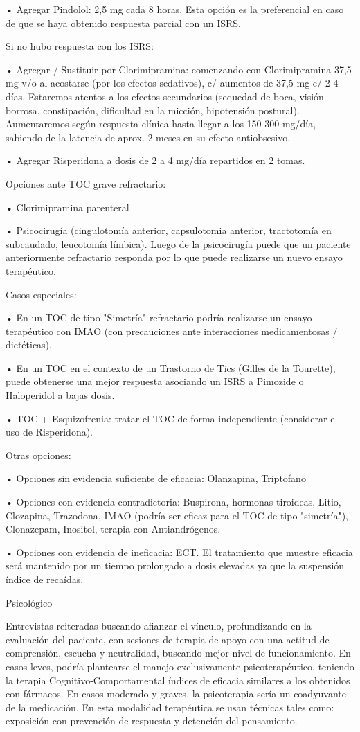 \documentclass[encares.tex]{subfiles}
\begin{document}
• Agregar Pindolol: 2,5 mg cada 8 horas. Esta opción es la preferencial en caso de que se haya obtenido respuesta parcial con un ISRS.

Si no hubo respuesta con los ISRS:

• Agregar / Sustituir por Clorimipramina: comenzando con Clorimipramina 37,5 mg v/o al acostarse (por los efectos sedativos), c/ aumentos de 37,5 mg c/ 2-4 días. Estaremos atentos a los efectos secundarios (sequedad de boca, visión borrosa, constipación, dificultad en la micción, hipotensión postural). Aumentaremos según respuesta clínica hasta llegar a los 150-300 mg/día, sabiendo de la latencia de aprox. 2 meses en su efecto antiobsesivo.

• Agregar Risperidona a dosis de 2 a 4 mg/día repartidos en 2 tomas.

Opciones ante TOC grave refractario:

• Clorimipramina parenteral

• Psicocirugía (cingulotomía anterior, capsulotomia anterior, tractotomía en subcaudado, leucotomía límbica). Luego de la psicocirugía puede que un paciente anteriormente refractario responda por lo que puede realizarse un nuevo ensayo terapéutico.

Casos especiales:

• En un TOC de tipo "Simetría" refractario podría realizarse un ensayo terapéutico con IMAO (con precauciones ante interacciones medicamentosas / dietéticas).

• En un TOC en el contexto de un Trastorno de Tics (Gilles de la Tourette), puede obtenerse una mejor respuesta asociando un ISRS a Pimozide o Haloperidol a bajas dosis.

• TOC + Esquizofrenia: tratar el TOC de forma independiente (considerar el uso de Risperidona).

Otras opciones:

• Opciones sin evidencia suficiente de eficacia: Olanzapina, Triptofano

• Opciones con evidencia contradictoria: Buspirona, hormonas tiroideas, Litio, Clozapina, Trazodona, IMAO (podría ser eficaz para el TOC de tipo "simetría"), Clonazepam, Inositol, terapia con Antiandrógenos.

• Opciones con evidencia de ineficacia: ECT. El tratamiento que muestre eficacia será mantenido por un tiempo prolongado a dosis elevadas ya que la suspensión índice de recaídas.

Psicológico

Entrevistas reiteradas buscando afianzar el vínculo, profundizando en la evaluación del paciente, con sesiones de terapia de apoyo con una actitud de comprensión, escucha y neutralidad, buscando mejor nivel de funcionamiento. En casos leves, podría plantearse el manejo exclusivamente psicoterapéutico, teniendo la terapia Cognitivo-Comportamental índices de eficacia similares a los obtenidos con fármacos. En casos moderado y graves, la psicoterapia sería un coadyuvante de la medicación. En esta modalidad terapéutica se usan técnicas tales como: exposición con prevención de respuesta y detención del pensamiento.
\end{document}
